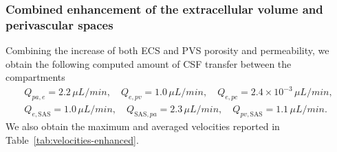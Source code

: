\documentclass[a4paper,11pt]{article} %
\newcommand{\JR}[1]{\textcolor{orange}{JR: #1}}
\newcommand{\1}{^{(1)}}
\newcommand{\2}{^{(2)}}
\begin{document}


\subsubsection{Combined enhancement of the extracellular volume and perivascular spaces}
\label{subsec:combined-res}


Combining the increase of both ECS and PVS porosity and permeability, we obtain the following computed amount of CSF transfer between the compartments
\[
\begin{aligned}
    Q_{pa,e} = 2.2 \, \si{\mu L/min},\quad Q_{e,pv} = 1.0 \,  \si{\mu L/min},\quad Q_{e,pc} = 2.4\times 10^{-3} \, \si{\mu L/min}, \\
    Q_{e,\text{SAS}} = 1.0 \, \si{\mu L/min} , \quad Q_{\text{SAS},pa} = 2.3 \, \si{\mu L/min},\quad Q_{pv,\text{SAS}} = 1.1 \, \si{\mu L/min}.
\end{aligned}
\]
We also obtain the maximum and averaged velocities reported in Table~\ref{tab:velocities-enhanced}. 
\end{document}

